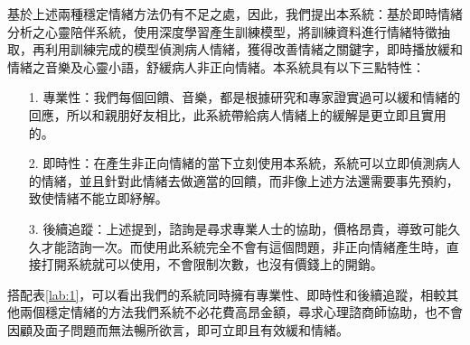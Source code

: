 \documentclass[12pt]{scrreprt}
\begin{document}
基於上述兩種穩定情緒方法仍有不足之處，因此，我們提出本系統：基於即時情緒分析之心靈陪伴系統，使用深度學習產生訓練模型，將訓練資料進行情緒特徵抽取，再利用訓練完成的模型偵測病人情緒，獲得改善情緒之關鍵字，即時播放緩和情緒之音樂及心靈小語，舒緩病人非正向情緒。本系統具有以下三點特性：
\begin{itemize}
\item[1.]{專業性：}我們每個回饋、音樂，都是根據研究和專家證實過可以緩和情緒的回應，所以和親朋好友相比，此系統帶給病人情緒上的緩解是更立即且實用的。


\item[2.]{ 即時性：}在產生非正向情緒的當下立刻使用本系統，系統可以立即偵測病人的情緒，並且針對此情緒去做適當的回饋，而非像上述方法還需要事先預約，致使情緒不能立即紓解。


\item[3.] {後續追蹤：}上述提到，諮詢是尋求專業人士的協助，價格昂貴，導致可能久久才能諮詢一次。而使用此系統完全不會有這個問題，非正向情緒產生時，直接打開系統就可以使用，不會限制次數，也沒有價錢上的開銷。
\end{itemize}

搭配表\ref{lab:1}，可以看出我們的系統同時擁有專業性、即時性和後續追蹤，相較其他兩個穩定情緒的方法我們系統不必花費高昂金額，尋求心理諮商師協助，也不會因顧及面子問題而無法暢所欲言，即可立即且有效緩和情緒。\\

\renewcommand{\arraystretch}{1.3} %
\begin{table}[!h]    
\centering
     \caption{各類穩定情緒方法之比較}
\label{lab:1}
\end{table}
\end{document}
